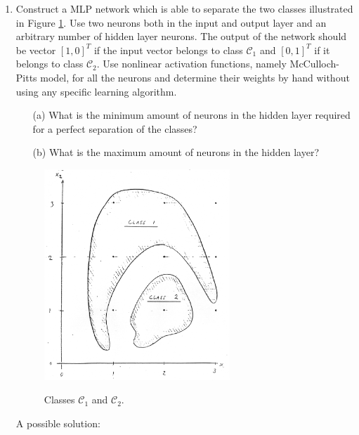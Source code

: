 \begin{enumerate}

\item Construct a MLP network which is able to separate the two
  classes illustrated in Figure \ref{61}. Use two neurons both in the input
  and output layer and an arbitrary number of hidden layer
  neurons. The output of the network should be vector $\left[ 1,
    0\right]^T$ if the input vector belongs to class $\mathcal{C}_1$ and  $\left[ 0,
    1\right]^T$ if it belongs to class $\mathcal{C}_2$. Use nonlinear activation
  functions, namely McCulloch-Pitts model, for all the neurons and
  determine their weights by hand without using any specific learning
  algorithm.
  \begin{itemize}
  \item[(a)] What is the minimum amount of neurons in the hidden layer
    required for a perfect separation of the classes?
  \item[(b)] What is the maximum amount of neurons in the hidden layer?
  \end{itemize}

  \begin{figure}[hbp]
    \centering
    \includegraphics[width=7cm]{mlp_classification.ps}
    \label{61}
    \caption{Classes $\mathcal{C}_1$ and $\mathcal{C}_2$.}
  \end{figure}

  \begin{solution}

    A possible solution:



\end{solution}
\end{enumerate}
